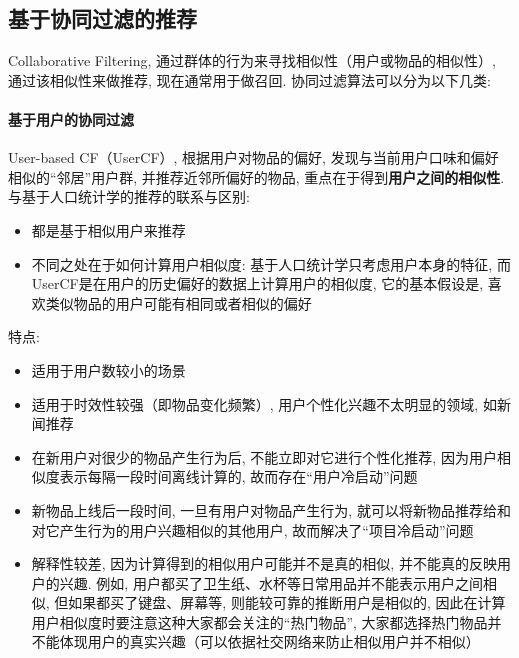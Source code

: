 \subsection{基于协同过滤的推荐}
Collaborative Filtering, 通过群体的行为来寻找相似性（用户或物品的相似性）, 通过该相似性来做推荐, 现在通常用于做召回. 协同过滤算法可以分为以下几类: 
\paragraph{基于用户的协同过滤}
User-based CF（UserCF）, 根据用户对物品的偏好, 发现与当前用户口味和偏好相似的“邻居”用户群, 并推荐近邻所偏好的物品, 重点在于得到\textbf{用户之间的相似性}. 与基于人口统计学的推荐的联系与区别: 
\begin{itemize}
	\item 都是基于相似用户来推荐
	\item 不同之处在于如何计算用户相似度: 基于人口统计学只考虑用户本身的特征, 而UserCF是在用户的历史偏好的数据上计算用户的相似度, 它的基本假设是, 喜欢类似物品的用户可能有相同或者相似的偏好
\end{itemize}
特点: 
\begin{itemize}
	\item 适用于用户数较小的场景
	\item 适用于时效性较强（即物品变化频繁）, 用户个性化兴趣不太明显的领域, 如新闻推荐
	\item 在新用户对很少的物品产生行为后, 不能立即对它进行个性化推荐, 因为用户相似度表示每隔一段时间离线计算的, 故而存在“用户冷启动”问题	
	\item 新物品上线后一段时间, 一旦有用户对物品产生行为, 就可以将新物品推荐给和对它产生行为的用户兴趣相似的其他用户, 故而解决了“项目冷启动”问题
	\item 解释性较差, 因为计算得到的相似用户可能并不是真的相似, 并不能真的反映用户的兴趣. 例如, 用户都买了卫生纸、水杯等日常用品并不能表示用户之间相似, 但如果都买了键盘、屏幕等, 则能较可靠的推断用户是相似的, 因此在计算用户相似度时要注意这种大家都会关注的“热门物品”, 大家都选择热门物品并不能体现用户的真实兴趣（可以依据社交网络来防止相似用户并不相似）
\end{itemize}

